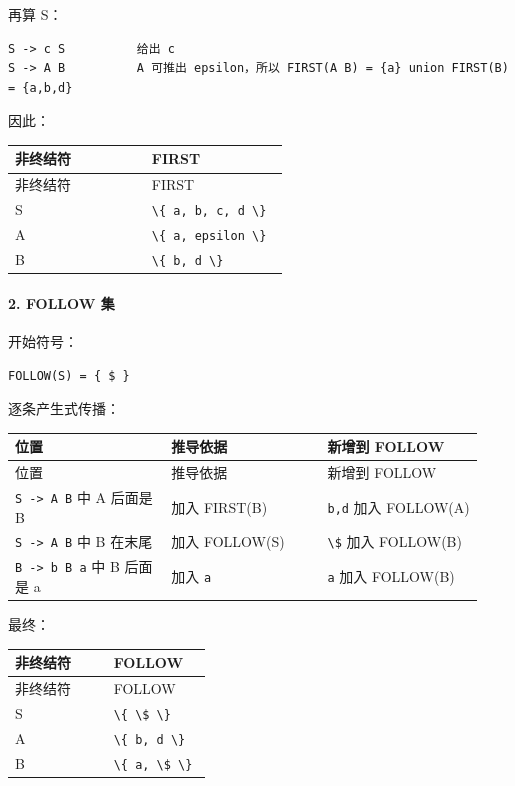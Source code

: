 \documentclass[UTF8]{ctexart}
\begin{document}
再算 S：

\begin{Verbatim}[fontsize=\small,breaklines=true]
S -> c S          给出 c
S -> A B          A 可推出 epsilon，所以 FIRST(A B) = {a} union FIRST(B) = {a,b,d}
\end{Verbatim}

因此：

\begin{longtable}{|p{0.47\linewidth}|p{0.47\linewidth}|}
\hline
非终结符 & FIRST \\
\hline
\endfirsthead
非终结符 & FIRST \\
\hline
\endhead
S & \texttt{\textbackslash{}\{ a, b, c, d \textbackslash{}\}} \\
\hline
A & \texttt{\textbackslash{}\{ a, epsilon \textbackslash{}\}} \\
\hline
B & \texttt{\textbackslash{}\{ b, d \textbackslash{}\}} \\
\hline
\end{longtable}

\paragraph*{2. FOLLOW 集}

开始符号：

\begin{Verbatim}[fontsize=\small,breaklines=true]
FOLLOW(S) = { $ }
\end{Verbatim}

逐条产生式传播：

\begin{longtable}{|p{0.31\linewidth}|p{0.31\linewidth}|p{0.31\linewidth}|}
\hline
位置 & 推导依据 & 新增到 FOLLOW \\
\hline
\endfirsthead
位置 & 推导依据 & 新增到 FOLLOW \\
\hline
\endhead
\texttt{S -> A B} 中 A 后面是 B & 加入 FIRST(B) & \texttt{b,d} 加入 FOLLOW(A) \\
\hline
\texttt{S -> A B} 中 B 在末尾 & 加入 FOLLOW(S) & \texttt{\textbackslash{}\$} 加入 FOLLOW(B) \\
\hline
\texttt{B -> b B a} 中 B 后面是 a & 加入 \texttt{a} & \texttt{a} 加入 FOLLOW(B) \\
\hline
\end{longtable}

最终：

\begin{longtable}{|p{0.47\linewidth}|p{0.47\linewidth}|}
\hline
非终结符 & FOLLOW \\
\hline
\endfirsthead
非终结符 & FOLLOW \\
\hline
\endhead
S & \texttt{\textbackslash{}\{ \textbackslash{}\$ \textbackslash{}\}} \\
\hline
A & \texttt{\textbackslash{}\{ b, d \textbackslash{}\}} \\
\hline
B & \texttt{\textbackslash{}\{ a, \textbackslash{}\$ \textbackslash{}\}} \\
\hline
\end{longtable}
\end{document}
